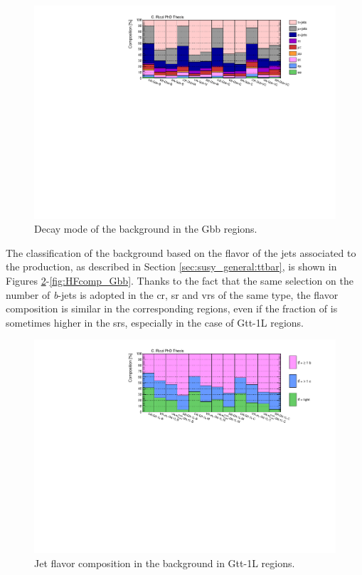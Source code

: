 \begin{figure}[htbp]
\includegraphics[width=\textwidth]{figures/Chap8/Rizzi-Fig8-15.pdf}
\caption{Decay mode of the \ttbar background in the Gbb regions.}
	\label{fig:ttcomp_Gbb}
\end{figure}


The classification of the \ttbar background based on the flavor of the jets associated to the 
\ttbar production, as described in Section \ref{sec:susy_general:ttbar}, is shown in Figures 
\ref{fig:HFcomp_Gtt1L}-\ref{fig:HFcomp_Gbb}. 
Thanks to the fact that the same selection on the number of \textit{b}-jets is adopted in the \gls{cr}, \gls{sr} and \glspl{vr} of the same type, 
the flavor composition is similar in the corresponding regions, 
even if the fraction of 
\tthf is sometimes higher in the \glspl{sr}, especially in the case of Gtt-1L regions. 


\begin{figure}[htbp]
\includegraphics[width=\textwidth]{figures/Chap8/Rizzi-Fig8-16.pdf}
\caption{Jet flavor composition in the \ttbar background in Gtt-1L regions.}
	\label{fig:HFcomp_Gtt1L}
\end{figure}

